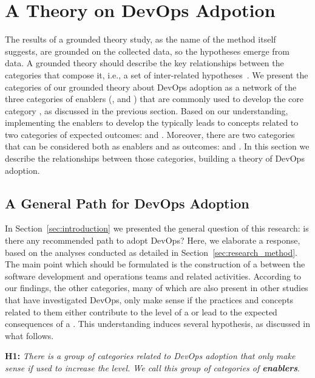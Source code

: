\section{A Theory on DevOps Adpotion} \label{sec:results}

The results of a grounded theory study, as the name of the method itself
suggests, are grounded on the collected data, so the hypotheses emerge from
data. A grounded theory should describe the key relationships between the
categories that compose it, i.e., a set of inter-related hypotheses~\cite{hoda2017becoming}.
We present the categories of our grounded theory
about DevOps adoption as a network of the three categories of enablers (,
 and ) that are commonly used to develop the core category
, as discussed in the previous section. Based on our understanding, 
implementing the enablers to develop the  typically leads 
to concepts related to two categories of expected outcomes:
 and . Moreover, there are two categories that can be considered
both as enablers and as outcomes:  and .
In this section we describe the relationships between those categories, building a theory 
of DevOps adoption. 

\subsection{A General Path for DevOps Adoption}

In Section~\ref{sec:introduction} we presented the general question of this
research: is there any recommended path to adopt DevOps? Here, we elaborate a response,
based on the analyses conducted as detailed in Section~\ref{sec:research_method}. The main
point which should be formulated is the construction of a  between the software development and operations teams and
related activities. According to our findings, the other categories,
many of which are also present in other studies that have investigated DevOps,
only make sense if the practices and
concepts related to them either contribute to the level of a  or lead to the expected consequences of a . This understanding induces several hypothesis, as discussed in
what follows.

\begin{mh}
\textbf{H1:} \textit{There is a group of categories related to DevOps adoption
that only make sense if used to increase the}  \emph{level. We
call this group of categories of \textbf{enablers}}.
\end{mh}

